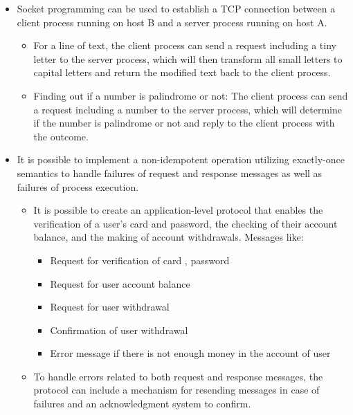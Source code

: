 \documentclass[11pt]{article}
\begin{document}
\begin{itemize}
  \item Socket programming can be used to establish a TCP connection between a client process running on host B and a server process running on host A.
  
  \begin{itemize}
    \item For a line of text, the client process can send a request including a tiny letter to the server process, which will then transform all small letters to capital letters and return the modified text back to the client process.
    
    \item Finding out if a number is palindrome or not: The client process can send a request including a number to the server process, which will determine if the number is palindrome or not and reply to the client process with the outcome.
  \end{itemize}

  \item It is possible to implement a non-idempotent operation utilizing exactly-once semantics to handle failures of request and response messages as well as failures of process execution.
  
  \begin{itemize}
    \item  It is possible to create an application-level protocol that enables the verification of a user's card and password, the checking of their account balance, and the making of account withdrawals. Messages like: 
    
    \begin{itemize}
      \item Request for verification of card , password
      \item Request for user account balance
      \item Request for user withdrawal
      \item Confirmation of user withdrawal
      \item Error message if there is not enough money in the account of user 
    \end{itemize}

    \item To handle errors related to both request and response messages, the protocol can include a mechanism for resending messages in case of failures and an acknowledgment system to confirm.
  \end{itemize}
\end{itemize}
\end{document}

